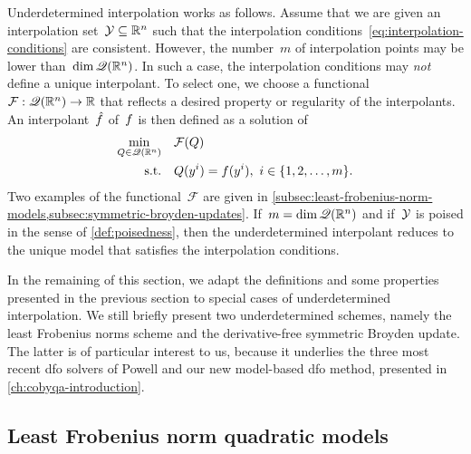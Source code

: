 Underdetermined interpolation works as follows.
Assume that we are given an interpolation set~$\xpt \subseteq \R^n$ such that the interpolation conditions~\cref{eq:interpolation-conditions} are consistent.
However, the number~$m$ of interpolation points may be lower than~$\dim \mathscr{Q}(\mathbb{R}^n)$.
In such a case, the interpolation conditions may \emph{not} define a unique interpolant.
To select one, we choose a functional~$\mathcal{F} : \mathscr{Q}(\mathbb{R}^n) \to \mathbb{R}$ that reflects a desired property or regularity of the interpolants.
An interpolant~$\objm$ of~$f$ is then defined as a solution of
\begin{subequations}
    \label{eq:underdetermined-models}
    \begin{align}
        \min_{Q \in \mathscr{Q}(\mathbb{R}^n)} & \quad \mathcal{F}(Q)\\
        \text{s.t.}         & \quad Q(y^i) = f(y^i), ~ i \in \{1, 2, \dots, m\}.
    \end{align}
\end{subequations}
Two examples of the functional~$\mathcal{F}$ are given in \cref{subsec:least-frobenius-norm-models,subsec:symmetric-broyden-updates}.
If~$m = \dim \mathscr{Q}(\mathbb{R}^n)$ and if~$\xpt$ is poised in the sense of \cref{def:poisedness}, then the underdetermined interpolant reduces to the unique model that satisfies the interpolation conditions.

In the remaining of this section, we adapt the definitions and some properties presented in the previous section to special cases of underdetermined interpolation.
We still briefly present two underdetermined schemes, namely the least Frobenius norms scheme and the derivative-free symmetric Broyden update.
The latter is of particular interest to us, because it underlies the three most recent \gls{dfo} solvers of Powell and our new model-based \gls{dfo} method, presented in \cref{ch:cobyqa-introduction}.

\subsection{Least Frobenius norm quadratic models}
\label{subsec:least-frobenius-norm-models}

